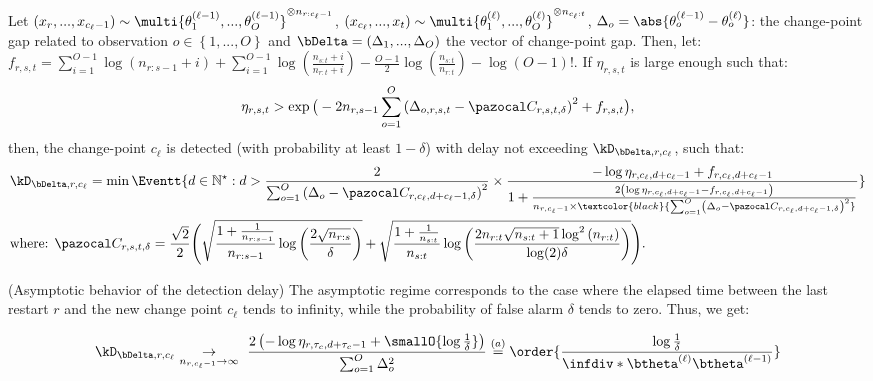 \documentclass{article} %
\begin{document}
\begin{theorem}
Let $\left( x_r,...,x_{c_\ell-1} \right) \sim \multi{\theta^{(\ell-1)}_1,..., \theta^{(\ell-1)}_O}^{\otimes n_{r:c_\ell-1}}$, $\left(x_{c_\ell},...,x_{t}\right) \sim \multi{\theta^{(\ell)}_1,..., \theta^{(\ell)}_O}^{\otimes n_{c_\ell:t}}$, $\Delta_o = \abs{\theta^{(\ell-1)}_o - \theta^{(\ell)}_o}$: the change-point gap related to observation $o 
\in \left\lbrace 1,..., O \right\rbrace$ and $\bDelta = \left(\Delta_1,...,\Delta_O \right)$ the vector of change-point gap. Then, let: $f_{r,s,t} = \sum_{i=1}^{O-1} \log \left( n_{r:s-1}+i  \right) + \sum_{i=1}^{O-1} \log \left( \frac{n_{s:t}+i}{n_{r:t}+i}  \right) - \frac{O-1}{2} \log \left( \frac{n_{s:t}}{n_{r:t}} \right) - \log(O-1)! $. If $\eta_{r,s,t}$ is large enough such that:
\begin{align}
\eta_{r,s,t} >  
\exp\big(-2n_{r,s-1}\sum_{o=1}^O\left(\Delta_{o,r,s,t} - \pC_{r,s,t,\delta}  \right)^2 + f_{r,s,t} \big), 
\label{Eq::LWEta}
\end{align}
then, the change-point $c_\ell$ is detected (with probability at least $1-\delta$) with delay not exceeding $	\kD_{\bDelta,r,c_\ell}$, such that:
\begin{align}
&\kD_{\bDelta,r,c_\ell} =  \min \Eventt{d \in \mathbb{N}^\star: d > \frac{2}{\sum_{o=1}^{O}\left(\Delta_o - \pC_{r,c_\ell, d+ c_\ell-1 ,\delta}  \right)^2} \times \frac{-\log \eta_{r,c_\ell,d+c_\ell-1} + f_{r,c_\ell,d+c_\ell-1}}{1+\frac{2\left(\log \eta_{r,c_\ell,d+c_\ell-1} - f_{r,c_\ell,d+c_\ell-1}\right)}{n_{r,c_\ell-1}\times   \textcolor{black}{\sum_{o=1}^{O}\left(\Delta_o - \pC_{r,c_\ell, d+ c_\ell-1 ,\delta}  \right)^2}}}} \\
&\text{where: } \pC_{r,s,t,\delta} = \frac{\sqrt{2}}{2} \Bigg( \sqrt{\frac{1+\frac{1}{n_{r:s-1}}}{n_{r:s-1}} \log \left(\frac{2\sqrt{n_{r:s}}}{\delta}\right)} +\sqrt{\frac{1+\frac{1}{n_{s:t}}}{n_{s:t}} \log \left(\frac{2n_{r:t} \sqrt{n_{s:t}+1} \log^{2}\left(n_{r:t}\right)}{\log(2) \delta}\right)}\Bigg). \label{Eq::C}
\end{align}
\label{Theorem:DetectionDelay}
\end{theorem}


\begin{discussion}({Asymptotic behavior of the detection delay)}
The asymptotic regime corresponds to the case where the elapsed time between the last restart $r$ and the new change point $c_\ell$ tends to infinity, while the probability of false alarm $\delta$ tends to zero. Thus, we get:

\begin{align}
\kD_{\bDelta,r,c_\ell}  \underset{n_{r,c_\ell-1} \rightarrow \infty}{\rightarrow}
\  \frac{2 \left( -\log \eta_{r,\tau_c,d+ \tau_c-1}+ \smallO{\log \tfrac{1}{\delta}}\right)}{\sum_{o=1}^{O}\Delta_o^2} \overset{(a)}{=}  \order{\frac{\log \frac{1}{\delta}}{\infdiv*{\btheta^{(\ell)}}{\btheta^{(\ell-1)}}} }
\label{eq::DetectionDelay}
\end{align}    
\end{discussion}
\end{document}
